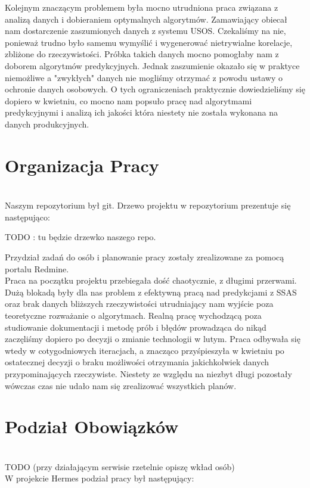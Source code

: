 \documentclass[licencjacka]{pracamgr}
\begin{document}
Kolejnym znaczącym problemem była mocno utrudniona praca związana z analizą danych i dobieraniem optymalnych algorytmów. Zamawiający obiecał nam dostarczenie zaszumionych danych z systemu USOS. Czekaliśmy na nie, ponieważ trudno było samemu wymyślić i wygenerować nietrywialne korelacje, zbliżone do rzeczywistości. Próbka takich danych mocno pomogłaby nam z doborem algorytmów predykcyjnych. Jednak zaszumienie okazało się w praktyce niemożliwe a "zwykłych" danych nie mogliśmy otrzymać z powodu ustawy o ochronie danych osobowych. O tych ograniczeniach praktycznie dowiedzieliśmy się dopiero w kwietniu, co mocno nam popsuło pracę nad algorytmami predykcyjnymi i analizą ich jakości która niestety nie została wykonana na danych produkcyjnych.

\section{Organizacja Pracy} ~\\


Naszym repozytorium był git. Drzewo projektu w repozytorium prezentuje się następująco:

TODO : tu będzie drzewko naszego repo.

Przydział zadań do osób i planowanie pracy zostały zrealizowane za pomocą portalu Redmine. \\

Praca na początku projektu przebiegała dość chaotycznie, z długimi przerwami. Dużą blokadą były dla nas problem z efektywną pracą nad predykcjami z SSAS oraz brak danych bliższych rzeczywistości utrudniający nam wyjście poza teoretyczne rozważanie o algorytmach. Realną pracę wychodzącą poza studiowanie dokumentacji i metodę prób i błędów prowadząca do nikąd zaczęliśmy dopiero po decyzji o zmianie technologii w lutym. Praca odbywała się wtedy w cotygodniowych iteracjach, a znacząco przyśpieszyła w kwietniu po ostatecznej decyzji o braku możliwości otrzymania jakichkolwiek danych przypominających rzeczywiste. Niestety ze względu na niezbyt długi pozostały wówczas czas nie udało nam się zrealizować wszystkich planów.

\section{Podział Obowiązków} ~\\

TODO (przy działającym serwisie rzetelnie opiszę wkład osób)
~\\ \indent W projekcie Hermes podział pracy był następujący:
\end{document}

